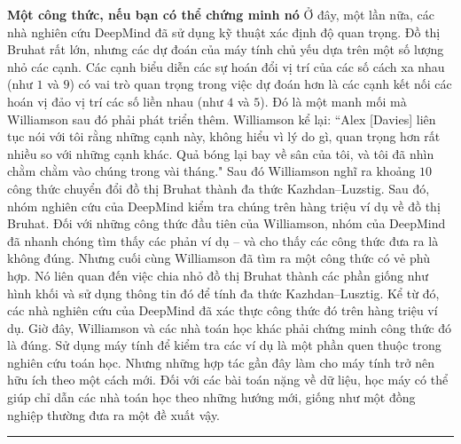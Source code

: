 \begin{multicols}{2}
	\vskip 0.05cm
	\textbf{\color{duongvaotoanhoc}Một công thức, nếu bạn có thể chứng minh nó}
	\vskip 0.05cm
	Ở đây, một lần nữa, các nhà nghiên cứu DeepMind đã sử dụng kỹ thuật xác định độ quan trọng. Đồ thị Bruhat rất lớn, nhưng các dự đoán của máy tính chủ yếu dựa trên một số lượng nhỏ các cạnh. Các cạnh biểu diễn các sự hoán đổi vị trí của các số cách xa nhau (như $1$ và $9$) có vai trò quan trọng trong việc dự đoán hơn là các cạnh kết nối các hoán vị đảo vị trí các số liền nhau (như $4$ và $5$). Đó là một manh mối mà Williamson sau đó phải phát triển thêm.
	\vskip 0.05cm
	Williamson kể lại: ``Alex [Davies] liên tục nói với tôi rằng những cạnh này, không hiểu vì lý do gì, quan trọng hơn rất nhiều so với những cạnh khác. Quả bóng  lại bay về sân  của tôi, và tôi đã nhìn chằm chằm vào chúng trong vài tháng."
	\vskip 0.05cm
	Sau đó Williamson nghĩ ra khoảng $10$ công thức chuyển đổi đồ thị Bruhat thành đa thức Kazhdan--Luzstig. Sau đó, nhóm nghiên cứu của DeepMind kiểm tra chúng trên hàng triệu ví dụ về đồ thị Bruhat. Đối với những công thức đầu tiên của Williamson, nhóm của DeepMind đã nhanh chóng tìm thấy các phản ví dụ -- và cho thấy các công thức đưa ra là không đúng.
	\vskip 0.05cm
	Nhưng cuối cùng Williamson đã tìm ra một công thức có vẻ phù hợp. Nó liên quan đến việc chia nhỏ đồ thị Bruhat thành các phần giống như hình khối và sử dụng thông tin đó để tính đa thức Kazhdan--Lusztig. Kể từ đó, các nhà nghiên cứu của DeepMind đã xác thực công thức đó trên hàng triệu ví dụ. Giờ đây, Williamson và các nhà toán học khác phải chứng minh công thức đó là đúng.
	\vskip 0.05cm
	Sử dụng máy tính để kiểm tra các ví dụ là một phần quen thuộc trong nghiên cứu toán học. Nhưng những hợp tác gần đây làm cho máy tính trở nên hữu ích theo một cách mới. Đối với các bài toán nặng về dữ liệu, học máy có thể giúp chỉ dẫn các nhà toán học theo những hướng mới, giống như một đồng nghiệp thường đưa ra một đề xuất vậy.
\end{multicols}
\vspace*{-10pt}
\rule{1\linewidth}{0.1pt}
\begingroup
